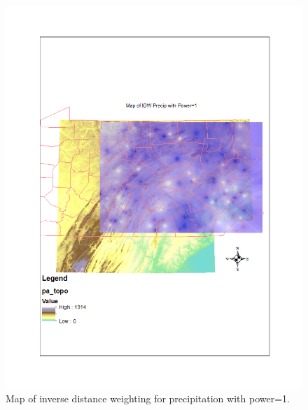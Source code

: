 \documentclass{article}\usepackage[]{graphicx}\usepackage[]{color}
\begin{document}
\begin{figure}
\includegraphics[scale=.9]{./figure/IDWprecip}
\caption{Map of inverse distance weighting for precipitation with power=1.}
\label{IDWprecip1}
\end{figure}
\end{document}

